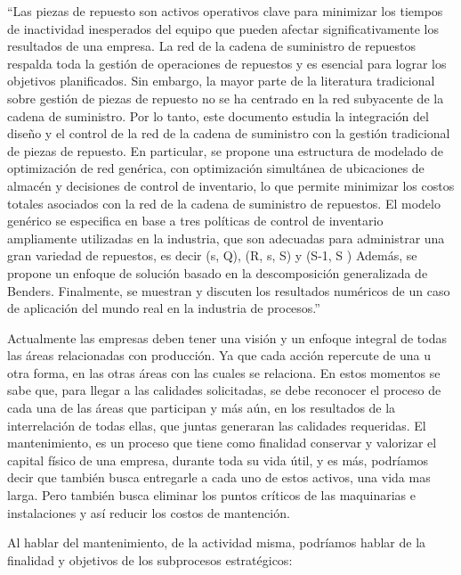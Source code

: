 \documentclass[]{article}
\begin{document}
\begin{enumerate}
“Las piezas de repuesto son activos operativos clave para minimizar los tiempos de inactividad inesperados del equipo que pueden afectar significativamente los resultados de una empresa. La red de la cadena de suministro de repuestos respalda toda la gestión de operaciones de repuestos y es esencial para lograr los objetivos planificados. Sin embargo, la mayor parte de la literatura tradicional sobre gestión de piezas de repuesto no se ha centrado en la red subyacente de la cadena de suministro. Por lo tanto, este documento estudia la integración del diseño y el control de la red de la cadena de suministro con la gestión tradicional de piezas de repuesto. En particular, se propone una estructura de modelado de optimización de red genérica, con optimización simultánea de ubicaciones de almacén y decisiones de control de inventario, lo que permite minimizar los costos totales asociados con la red de la cadena de suministro de repuestos. El modelo genérico se especifica en base a tres políticas de control de inventario ampliamente utilizadas en la industria, que son adecuadas para administrar una gran variedad de repuestos, es decir (s, Q), (R, s, S) y (S-1, S ) Además, se propone un enfoque de solución basado en la descomposición generalizada de Benders. Finalmente, se muestran y discuten los resultados numéricos de un caso de aplicación del mundo real en la industria de procesos.\cite{article}”

\end{enumerate}

Actualmente las empresas deben tener una visión y un enfoque integral de todas las áreas relacionadas con producción. Ya que cada acción repercute de una u otra forma, en las otras áreas con las cuales se relaciona. En estos momentos se sabe que, para llegar a las calidades solicitadas, se debe reconocer el proceso de cada una de las áreas que participan y más aún, en los resultados de la interrelación de todas ellas, que juntas generaran las calidades requeridas.
El mantenimiento, es un proceso que tiene como finalidad conservar y valorizar el capital físico de una empresa, durante toda su vida útil, y es más, podríamos decir que también busca entregarle a cada uno de estos activos, una vida mas larga. Pero también busca eliminar los puntos críticos de las maquinarias e instalaciones y así reducir los costos de mantención. 


Al hablar del mantenimiento, de la actividad misma, podríamos hablar de la finalidad y objetivos de los subprocesos estratégicos:
\end{document}
